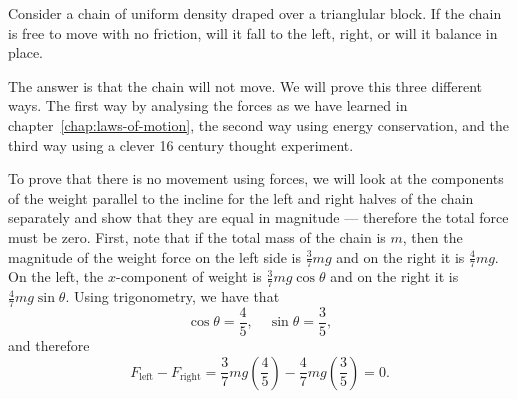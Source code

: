 \documentclass[../classical_mechanics.tex]{subfiles}
\begin{document}
        \begin{example}
            Consider a chain of uniform density draped over a trianglular block.
            If the chain is free to move with no friction, will it fall to the left, right, or will it balance in place.

            The answer is that the chain will not move.
            We will prove this three different ways.
            The first way by analysing the forces as we have learned in chapter~\ref{chap:laws-of-motion}, the second way using energy conservation, and the third way using a clever 16 century thought experiment.

            To prove that there is no movement using forces, we will look at the components of the weight parallel to the incline for the left and right halves of the chain separately and show that they are equal in magnitude --- therefore the total force must be zero.
            First, note that if the total mass of the chain is $m$, then the magnitude of the weight force on the left side is $\frac{3}{7}mg$ and on the right it is $\frac{4}{7}mg$.
            On the left, the $x$-component of weight is $\frac{3}{7}mg\cos\theta$ and on the right it is $\frac{4}{7}mg\sin\theta$.
            Using trigonometry, we have that
            \begin{equation}
                \cos\theta=\frac{4}{5},\quad\sin\theta=\frac{3}{5},
            \end{equation}
            and therefore
            \begin{equation}
                F_\text{left}-F_\text{right}=\frac{3}{7}mg(\frac{4}{5})-\frac{4}{7}mg(\frac{3}{5})=0.
            \end{equation}


\end{example}
\end{document}
